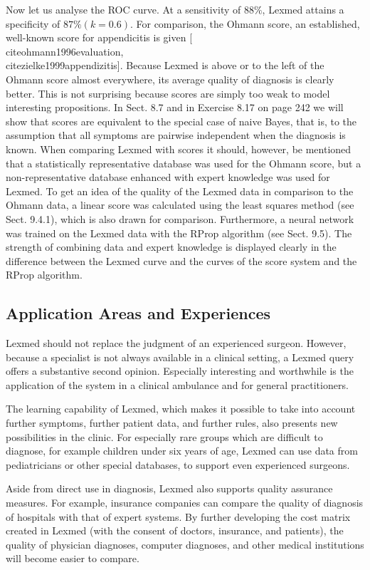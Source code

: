 \documentclass[10pt]{book}
\begin{document}
Now let us analyse the ROC curve. At a sensitivity of $88 \%$, Lexmed attains a specificity of $87 \%(k=0.6)$. For comparison, the Ohmann score, an established, well-known score for appendicitis is given [\\cite{ohmann1996evaluation}, \\cite{zielke1999appendizitis}]. Because Lexmed is above or to the left of the Ohmann score almost everywhere, its average quality of diagnosis is clearly better. This is not surprising because scores are simply too weak to model interesting propositions. In Sect. 8.7 and in Exercise 8.17 on page 242 we will show that scores are equivalent to the special case of naive Bayes, that is, to the assumption that all symptoms are pairwise independent when the diagnosis is known. When comparing Lexmed with scores it should, however, be mentioned that a statistically representative database was used for the Ohmann score, but a non-representative database enhanced with expert knowledge was used for Lexmed. To get an idea of the quality of the Lexmed data in comparison to the Ohmann data, a linear score was calculated using the least squares method (see Sect. 9.4.1), which is also drawn for comparison. Furthermore, a neural network was trained on the Lexmed data with the RProp algorithm (see Sect. 9.5). The strength of combining data and expert knowledge is displayed clearly in the difference between the Lexmed curve and the curves of the score system and the RProp algorithm.

\subsection{Application Areas and Experiences}
Lexmed should not replace the judgment of an experienced surgeon. However, because a specialist is not always available in a clinical setting, a Lexmed query offers a substantive second opinion. Especially interesting and worthwhile is the application of the system in a clinical ambulance and for general practitioners.

The learning capability of Lexmed, which makes it possible to take into account further symptoms, further patient data, and further rules, also presents new possibilities in the clinic. For especially rare groups which are difficult to diagnose, for example children under six years of age, Lexmed can use data from pediatricians or other special databases, to support even experienced surgeons.

Aside from direct use in diagnosis, Lexmed also supports quality assurance measures. For example, insurance companies can compare the quality of diagnosis of hospitals with that of expert systems. By further developing the cost matrix created in Lexmed (with the consent of doctors, insurance, and patients), the quality of physician diagnoses, computer diagnoses, and other medical institutions will become easier to compare.
\end{document}
